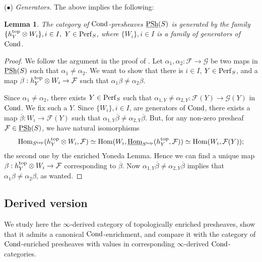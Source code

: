 \documentclass[10pt]{amsart}
\newtheorem{lemma}[equation]{Lemma}
\theoremstyle{definition}
\theoremstyle{remark}
\newcommand{\Hom}{{\rm{Hom}} }
\newcommand{\uHom}{\underline{{\rm{Hom}} }}
\newcommand{\sff}{{\mathcal{F}}}
\newcommand{\sg}{{\mathcal{G}}}
\numberwithin{equation}{section}
\numberwithin{equation}{section}
\begin{document}
\vskip2mm
 ($\bullet$) {\em Generators.} The above implies the following: 
 \begin{lemma}\label{trump1} The  category of ${\rm Cond}$-presheaves 
$\underline{\rm PSh}(S)$ is generated by the family $\{h^{\rm top}_Y\otimes W_i\}, i\in I,$
 $Y\in {\rm Perf}_S$, where $\{W_i\}, i\in I$ is a family  of generators of ${\rm Cond}$. %
\end{lemma}
\begin{proof} 
 We follow the argument in the proof of \cite[Th. 4.2]{Gr}. 
Let $\alpha_1, \alpha_2: \sff \to \sg$  be two  maps in $\underline{\rm PSh}(S)$ such that $\alpha_1\neq \alpha_2$. We want to show that there is $i \in  I$, $Y\in {\rm Perf}_S$, and a map
$\beta:  h^{\rm top}_Y\otimes W_i\to  \sff$  such that $\alpha_1\beta \neq   \alpha_2 \beta$.

 Since $\alpha_1\neq \alpha_2$, there exists $Y \in {\rm Perf}_S$ such that   $\alpha_{1,Y}\neq  \alpha_{2,Y}: \sff(Y)\to \sg(Y)$ in  ${\rm Cond}$. We fix such a $Y$. Since 
$ \{W_i\}, i\in I $, are generators of ${\rm Cond}$,  there exists a map $\overline{\beta} : W_i \to \sff(Y) $ such that $\alpha_{1,Y} \overline{\beta}\neq \alpha_{2,Y} \overline{\beta}$.
But, for any non-zero presheaf $\sff\in \underline{\rm PSh}(S)$, we have natural isomorphisms
\begin{align*}\Hom_{S^{\rm top}}(h^{\rm top}_Y\otimes W_i,\sff)\simeq \Hom(W_i,\uHom_{S^{\rm top}}(h^{\rm top}_Y,\sff))\simeq\Hom(W_i,\sff(Y));
\end{align*}
the second one by the enriched Yoneda Lemma. 
Hence  we can find a unique map $\beta : h^{\rm top}_Y\otimes W_i\to \sff$ corresponding to $\overline{\beta}$.
Now $\alpha_{1,Y} \overline{\beta} \neq  \alpha_{2,Y} \overline{\beta}$ implies that $\alpha_1 \beta \neq  \alpha_2 \beta$, as wanted.
\end{proof}

  \subsection{Derived version} \label{plane1} We study here the $\infty$-derived category of topologically enriched presheaves, show that it admits a canonical ${\rm Cond}$-enrichment, and compare it with the category of ${\rm Cond}$-enriched presheaves with values in corresponding $\infty$-derived ${\rm Cond}$-categories. 
\end{document}

